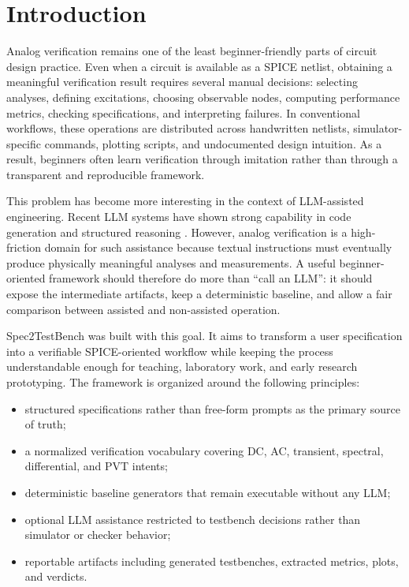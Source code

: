 \documentclass[conference]{IEEEtran}
\begin{document}
\section{Introduction}
Analog verification remains one of the least beginner-friendly parts of circuit design practice. Even when a circuit is available as a SPICE netlist, obtaining a meaningful verification result requires several manual decisions: selecting analyses, defining excitations, choosing observable nodes, computing performance metrics, checking specifications, and interpreting failures. In conventional workflows, these operations are distributed across handwritten netlists, simulator-specific commands, plotting scripts, and undocumented design intuition. As a result, beginners often learn verification through imitation rather than through a transparent and reproducible framework.

This problem has become more interesting in the context of LLM-assisted engineering. Recent LLM systems have shown strong capability in code generation and structured reasoning \cite{vaswani2017attention,brown2020language,openai2023gpt4}. However, analog verification is a high-friction domain for such assistance because textual instructions must eventually produce physically meaningful analyses and measurements. A useful beginner-oriented framework should therefore do more than ``call an LLM'': it should expose the intermediate artifacts, keep a deterministic baseline, and allow a fair comparison between assisted and non-assisted operation.

Spec2TestBench was built with this goal. It aims to transform a user specification into a verifiable SPICE-oriented workflow while keeping the process understandable enough for teaching, laboratory work, and early research prototyping. The framework is organized around the following principles:

\begin{itemize}
\item structured specifications rather than free-form prompts as the primary source of truth;
\item a normalized verification vocabulary covering DC, AC, transient, spectral, differential, and PVT intents;
\item deterministic baseline generators that remain executable without any LLM;
\item optional LLM assistance restricted to testbench decisions rather than simulator or checker behavior;
\item reportable artifacts including generated testbenches, extracted metrics, plots, and verdicts.
\end{itemize}
\end{document}
